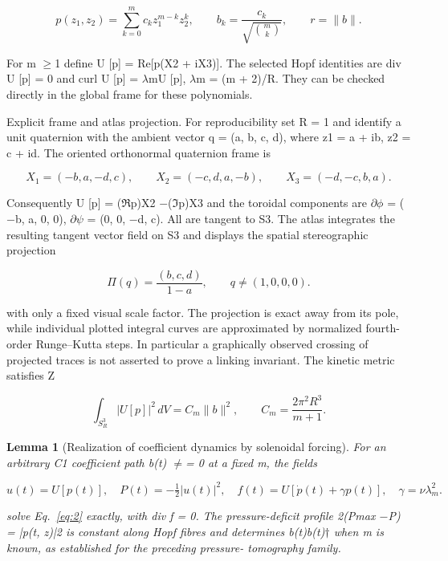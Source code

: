\documentclass[10pt,letterpaper]{article}
\newtheorem{lemma}[theorem]{Lemma}
\theoremstyle{remark}
\begin{document}
\begin{equation}
\tag{19}\label{eq:19}
p(z_1,z_2)=\sum_{k=0}^mc_kz_1^{m-k}z_2^k,\qquad b_k=\frac{c_k}{\sqrt{\binom mk}},\qquad r=\|b\|.
\end{equation}

For m \(\ge \)1 define U [p] = Re[p(X2 + iX3)]. The selected Hopf identities are div U [p] = 0 and curl U [p] = \(\lambda \)mU [p], \(\lambda \)m = (m + 2)/R. They can be checked directly in the global frame for these polynomials.


Explicit frame and atlas projection. For reproducibility set R = 1 and identify a unit quaternion with the ambient vector q = (a, b, c, d), where z1 = a + ib, z2 = c + id. The oriented orthonormal quaternion frame is



\begin{equation}
\tag{20}\label{eq:20}
X_1=(-b,a,-d,c),\qquad X_2=(-c,d,a,-b),\qquad X_3=(-d,-c,b,a).
\end{equation}

Consequently U [p] = (\(\Re \)p)X2 \(- \)(\(\Im \)p)X3 and the toroidal components are \(\partial \phi \) = (\(- \)b, a, 0, 0), \(\partial \psi \) = (0, 0, \(- \)d, c). All are tangent to S3. The atlas integrates the resulting tangent vector field on S3 and displays the spatial stereographic projection



\begin{equation}
\tag{21}\label{eq:21}
\Pi(q)=\frac{(b,c,d)}{1-a},\qquad q\ne(1,0,0,0).
\end{equation}

with only a fixed visual scale factor. The projection is exact away from its pole, while individual plotted integral curves are approximated by normalized fourth-order Runge–Kutta steps. In particular a graphically observed crossing of projected traces is not asserted to prove a linking invariant. The kinetic metric satisfies Z



\begin{equation}
\tag{22}\label{eq:22}
\int_{S_R^3}|U[p]|^2\,dV=C_m\|b\|^2,\qquad C_m=\frac{2\pi^2R^3}{m+1}.
\end{equation}

\begin{lemma}[Realization of coefficient dynamics by solenoidal forcing]

For an arbitrary C1 coefficient path b(t) \(\ne \)= 0 at a fixed m, the fields


\begin{equation}
\tag{23}\label{eq:23}
u(t)=U[p(t)],\quad P(t)=-\tfrac12|u(t)|^2,\quad f(t)=U[\dot p(t)+\gamma p(t)],\quad\gamma=\nu\lambda_m^2.
\end{equation}

solve Eq.~\eqref{eq:2} exactly, with div f = 0. The pressure-deficit profile 2(Pmax \(- \)P) = |p(t, z)|2 is constant along Hopf fibres and determines b(t)b(t)\(\dagger \) when m is known, as established for the preceding pressure- tomography family.


\end{lemma}
\end{document}
